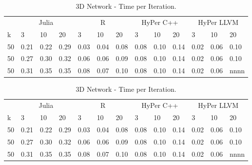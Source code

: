 \begin{table}[htsb]
  \caption[3D Network - Time per Iteration]{3D Network - Time per Iteration.}
  \label{tab:network_all}
  \centering
  \begin{tabular}{l l l l l l l l l l l l l}
    \toprule
      & \multicolumn{3}{c}{Julia} & \multicolumn{3}{c}{R} & \multicolumn{3}{c}{HyPer C++} & \multicolumn{3}{c}{HyPer LLVM}  \\
      k & 3 & 10 & 20 & 3 & 10 & 20 & 3 & 10 & 20 & 3 & 10 & 20 \\
    \midrule
      50  & 0.21 & 0.22 & 0.29 & 0.03 & 0.04 & 0.08 & 0.08 & 0.10 & 0.14 & 0.02 & 0.06 & 0.10 \\
      50  & 0.27 & 0.30 & 0.32 & 0.06 & 0.06 & 0.09 & 0.08 & 0.10 & 0.14 & 0.02 & 0.06 & 0.10 \\
      50  & 0.31 & 0.35 & 0.35 & 0.08 & 0.07 & 0.10 & 0.08 & 0.10 & 0.14 & 0.02 & 0.06 & nnnn \\
    \bottomrule
  \end{tabular}
\end{table}
\begin{table}[htsb]
  \caption[3D Network - Time per Iteration]{3D Network - Time per Iteration.}
  \label{tab:network_all}
  \centering
  \begin{tabular}{l l l l l l l l l l l l l}
    \toprule
      & \multicolumn{3}{c}{Julia} & \multicolumn{3}{c}{R} & \multicolumn{3}{c}{HyPer C++} & \multicolumn{3}{c}{HyPer LLVM}  \\
      k & 3 & 10 & 20 & 3 & 10 & 20 & 3 & 10 & 20 & 3 & 10 & 20 \\
    \midrule
      50  & 0.21 & 0.22 & 0.29 & 0.03 & 0.04 & 0.08 & 0.08 & 0.10 & 0.14 & 0.02 & 0.06 & 0.10 \\
      50  & 0.27 & 0.30 & 0.32 & 0.06 & 0.06 & 0.09 & 0.08 & 0.10 & 0.14 & 0.02 & 0.06 & 0.10 \\
      50  & 0.31 & 0.35 & 0.35 & 0.08 & 0.07 & 0.10 & 0.08 & 0.10 & 0.14 & 0.02 & 0.06 & nnnn \\
    \bottomrule
  \end{tabular}
\end{table}



